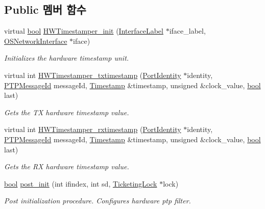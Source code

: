 \subsection*{Public 멤버 함수}
\begin{DoxyCompactItemize}
\item 
virtual \hyperlink{avb__gptp_8h_af6a258d8f3ee5206d682d799316314b1}{bool} \hyperlink{class_linux_timestamper_intel_c_e_a7a098484ed16d09074217e92eb22d03d}{H\+W\+Timestamper\+\_\+init} (\hyperlink{class_interface_label}{Interface\+Label} $\ast$iface\+\_\+label, \hyperlink{class_o_s_network_interface}{O\+S\+Network\+Interface} $\ast$iface)
\begin{DoxyCompactList}\small\item\em Initializes the hardware timestamp unit. \end{DoxyCompactList}\item 
virtual int \hyperlink{class_linux_timestamper_intel_c_e_a8ca092c3a907618eebf1d512de28db18}{H\+W\+Timestamper\+\_\+txtimestamp} (\hyperlink{class_port_identity}{Port\+Identity} $\ast$identity, \hyperlink{class_p_t_p_message_id}{P\+T\+P\+Message\+Id} message\+Id, \hyperlink{class_timestamp}{Timestamp} \&timestamp, unsigned \&clock\+\_\+value, \hyperlink{avb__gptp_8h_af6a258d8f3ee5206d682d799316314b1}{bool} last)
\begin{DoxyCompactList}\small\item\em Gets the TX hardware timestamp value. \end{DoxyCompactList}\item 
virtual int \hyperlink{class_linux_timestamper_intel_c_e_aa901ba145f6722e06d2ba9e133454279}{H\+W\+Timestamper\+\_\+rxtimestamp} (\hyperlink{class_port_identity}{Port\+Identity} $\ast$identity, \hyperlink{class_p_t_p_message_id}{P\+T\+P\+Message\+Id} message\+Id, \hyperlink{class_timestamp}{Timestamp} \&timestamp, unsigned \&clock\+\_\+value, \hyperlink{avb__gptp_8h_af6a258d8f3ee5206d682d799316314b1}{bool} last)
\begin{DoxyCompactList}\small\item\em Gets the RX hardware timestamp value. \end{DoxyCompactList}\item 
\hyperlink{avb__gptp_8h_af6a258d8f3ee5206d682d799316314b1}{bool} \hyperlink{class_linux_timestamper_intel_c_e_aeada5965d363813719d4b3e0c6ba209e}{post\+\_\+init} (int ifindex, int sd, \hyperlink{class_ticketing_lock}{Ticketing\+Lock} $\ast$lock)
\begin{DoxyCompactList}\small\item\em Post initialization procedure. Configures hardware ptp filter. \end{DoxyCompactList}\item 

\end{DoxyCompactItemize}
